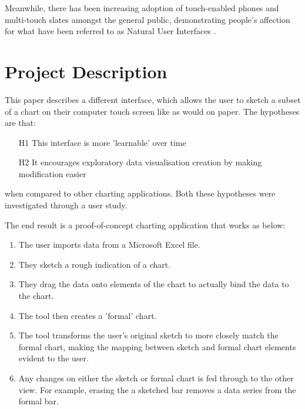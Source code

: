 Meanwhile, there has been increasing adoption of touch-enabled phones and multi-touch slates amongst the general public, demonstrating people's affection for what have been referred to as Natural User Interfaces \cite{lee_beyond_2012}.


\section{Project Description}
This paper describes a different interface, which allows the user to sketch a subset of a chart on their computer touch screen like as would on paper. The hypotheses are that:

\begin{enumerate}
\item[H1] This interface is more 'learnable' over time
\item[H2] It encourages exploratory data visualisation creation by making modification easier
\end{enumerate}

when compared to other charting applications. Both these hypotheses were investigated through a user study.


The end result is a proof-of-concept charting application that works as below:
\begin{enumerate}
\item The user imports data from a Microsoft Excel file.
\item They sketch a rough indication of a chart.
\item They drag the data onto elements of the chart to actually bind the data to the chart. 
\item The tool then creates a 'formal' chart.
\item The tool transforms the user's original sketch to more closely match the formal chart, making the mapping between sketch and formal chart elements evident to the user.
\item Any changes on either the sketch or formal chart is fed through to the other view. For example, erasing the a sketched bar removes a data series from the formal bar.
\end{enumerate}


